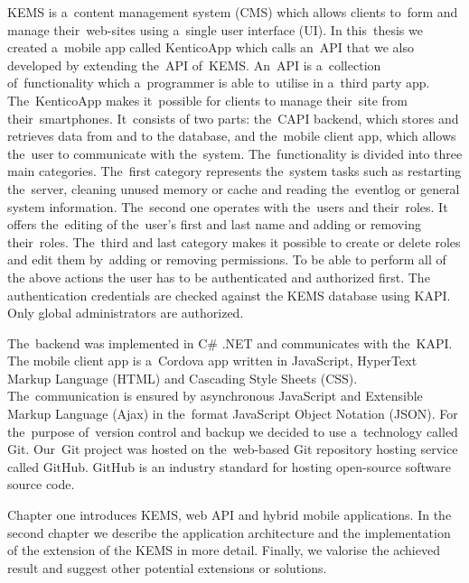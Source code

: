\label{introduction}
KEMS is a~content management system (CMS) which allows clients to~form and manage their~web-sites using a~single user interface (UI). In this~thesis we created a~mobile app called KenticoApp which calls an~API that we also developed by extending the~API of~KEMS. An~API is a~collection of~functionality which a~programmer is able to~utilise in a~third party app. The~KenticoApp makes it~possible for clients to manage their~site from their~smartphones. It~consists of two parts: the~CAPI backend, which stores and retrieves data from and to the database, and the~mobile client app, which allows the~user to communicate with the~system.  The~functionality is divided into three main categories. The~first category represents the~system tasks such as restarting the~server, cleaning unused memory or cache and reading the~eventlog or general system information. The~second one operates with the~users and their~roles. It offers the~editing of the~user's first and last name and adding or removing their~roles. The~third and last category makes it possible to create or delete roles and edit them by~adding or removing permissions. To be able to perform all of the above actions the user has to be authenticated and authorized first. The authentication credentials are checked against the KEMS database using KAPI. Only global administrators are authorized.

The~backend was implemented in C\# .NET and communicates with the~KAPI. The mobile client app is a~Cordova app written in JavaScript, HyperText Markup Language (HTML) and Cascading Style Sheets (CSS). The~communication is ensured by asynchronous JavaScript and Extensible Markup Language (Ajax) in the~format JavaScript Object Notation (JSON). For the~purpose of~version control and backup we decided to use a~technology called Git. Our~Git project was hosted on the~web-based Git repository hosting service called GitHub. GitHub is an industry standard for hosting open-source software source code. 

Chapter one introduces KEMS, web API and hybrid mobile applications. In the second chapter we describe the application architecture and the implementation of the extension of the KEMS in more detail. Finally, we valorise the achieved result and suggest other potential extensions or solutions.
